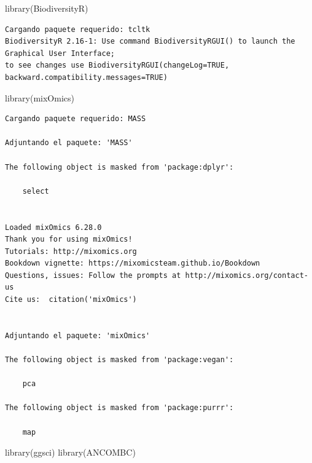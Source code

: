 \documentclass[
  letterpaper,
  DIV=11,
  numbers=noendperiod]{scrartcl}
\newenvironment{Shaded}{\begin{snugshade}}{\end{snugshade}}
\newcommand{\FunctionTok}[1]{\textcolor[rgb]{0.28,0.35,0.67}{#1}}
\newcommand{\NormalTok}[1]{\textcolor[rgb]{0.00,0.23,0.31}{#1}}
\begin{document}
\begin{Shaded}
\begin{Highlighting}[]
\FunctionTok{library}\NormalTok{(BiodiversityR)}
\end{Highlighting}
\end{Shaded}

\begin{verbatim}
Cargando paquete requerido: tcltk
BiodiversityR 2.16-1: Use command BiodiversityRGUI() to launch the Graphical User Interface; 
to see changes use BiodiversityRGUI(changeLog=TRUE, backward.compatibility.messages=TRUE)
\end{verbatim}

\begin{Shaded}
\begin{Highlighting}[]
\FunctionTok{library}\NormalTok{(mixOmics)}
\end{Highlighting}
\end{Shaded}

\begin{verbatim}
Cargando paquete requerido: MASS

Adjuntando el paquete: 'MASS'

The following object is masked from 'package:dplyr':

    select


Loaded mixOmics 6.28.0
Thank you for using mixOmics!
Tutorials: http://mixomics.org
Bookdown vignette: https://mixomicsteam.github.io/Bookdown
Questions, issues: Follow the prompts at http://mixomics.org/contact-us
Cite us:  citation('mixOmics')


Adjuntando el paquete: 'mixOmics'

The following object is masked from 'package:vegan':

    pca

The following object is masked from 'package:purrr':

    map
\end{verbatim}

\begin{Shaded}
\begin{Highlighting}[]
\FunctionTok{library}\NormalTok{(ggsci)}
\FunctionTok{library}\NormalTok{(ANCOMBC)}
\end{Highlighting}
\end{Shaded}
\end{document}
